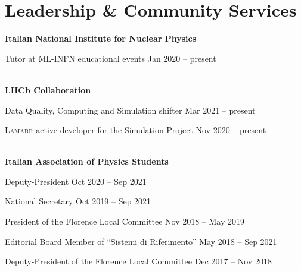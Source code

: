 \newcommand{\community}[1]
  {\normalsize \color{hlcolor-0} \textbf{#1}}

\newcommand{\button}[2]
  {\normalsize \color{maincolor} \href{#1}{#2}}
  
\newcommand{\comservice}[2]
  {{\normalsize \color{maincolor} #1} \hfill {\small \color{hlcolor-1} #2}}
  

\section*{Leadership \& Community Services}
\begin{cvcontent}
  \community{Italian National Institute for Nuclear Physics}
  \button{https://home.infn.it}{\faGlobe}\\ [1mm]
  \begin{itemize*}[label=\textcolor{iconcolor}{\textbullet}]
    \item \comservice{Tutor at ML-INFN educational events}
      {Jan 2020 -- present}
  \end{itemize*}
  \\ [4mm]
  \community{LHCb Collaboration}
  \button{http://lhcb.web.cern.ch}{\faGlobe}\\ [1mm]
  \begin{itemize*}[label=\textcolor{iconcolor}{\textbullet}]
    \item \comservice{Data Quality, Computing and Simulation shifter}
      {Mar 2021 -- present}\\ [0.5mm]
    \item \comservice{\textsc{Lamarr} active developer for the Simulation Project}
      {Nov 2020 -- present}
  \end{itemize*}
  \\ [4mm]
  \community{Italian Association of Physics Students}
  \button{https://ai-sf.it}{\faGlobe}\\ [1mm]
  \begin{itemize*}[label=\textcolor{iconcolor}{\textbullet}]
    \item \comservice{Deputy-President}
      {Oct 2020 -- Sep 2021}\\ [0.5mm]
    \item \comservice{National Secretary}
      {Oct 2019 -- Sep 2021}\\ [0.5mm]
    \item \comservice{President of the Florence Local Committee}
      {Nov 2018 -- May 2019}\\ [0.5mm]
    \item \comservice{Editorial Board Member of ``Sistemi di Riferimento''}
      {May 2018 -- Sep 2021}\\ [0.5mm]
    \item \comservice{Deputy-President of the Florence Local Committee}
      {Dec 2017 -- Nov 2018}
  \end{itemize*}
\end{cvcontent}